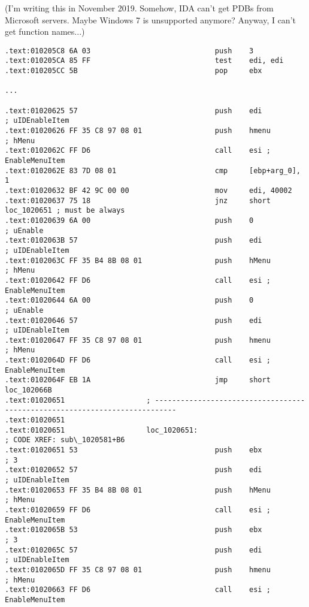 (I'm writing this in November 2019. Somehow, IDA can't get PDBs from Microsoft servers. Maybe Windows 7 is unsupported anymore?
Anyway, I can't get function names...)

\begin{lstlisting}[style=customasmx86,caption=Mahjong.exe]
.text:010205C8 6A 03                             push    3
.text:010205CA 85 FF                             test    edi, edi
.text:010205CC 5B                                pop     ebx

...

.text:01020625 57                                push    edi             ; uIDEnableItem
.text:01020626 FF 35 C8 97 08 01                 push    hmenu           ; hMenu
.text:0102062C FF D6                             call    esi ; EnableMenuItem
.text:0102062E 83 7D 08 01                       cmp     [ebp+arg_0], 1
.text:01020632 BF 42 9C 00 00                    mov     edi, 40002
.text:01020637 75 18                             jnz     short loc_1020651 ; must be always
.text:01020639 6A 00                             push    0               ; uEnable
.text:0102063B 57                                push    edi             ; uIDEnableItem
.text:0102063C FF 35 B4 8B 08 01                 push    hMenu           ; hMenu
.text:01020642 FF D6                             call    esi ; EnableMenuItem
.text:01020644 6A 00                             push    0               ; uEnable
.text:01020646 57                                push    edi             ; uIDEnableItem
.text:01020647 FF 35 C8 97 08 01                 push    hmenu           ; hMenu
.text:0102064D FF D6                             call    esi ; EnableMenuItem
.text:0102064F EB 1A                             jmp     short loc_102066B
.text:01020651                   ; ---------------------------------------------------------------------------
.text:01020651
.text:01020651                   loc_1020651:                            ; CODE XREF: sub\_1020581+B6
.text:01020651 53                                push    ebx             ; 3
.text:01020652 57                                push    edi             ; uIDEnableItem
.text:01020653 FF 35 B4 8B 08 01                 push    hMenu           ; hMenu
.text:01020659 FF D6                             call    esi ; EnableMenuItem
.text:0102065B 53                                push    ebx             ; 3
.text:0102065C 57                                push    edi             ; uIDEnableItem
.text:0102065D FF 35 C8 97 08 01                 push    hmenu           ; hMenu
.text:01020663 FF D6                             call    esi ; EnableMenuItem
\end{lstlisting}

